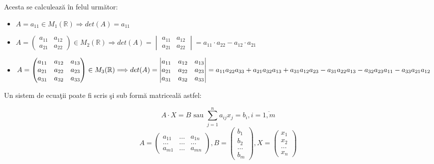 \documentclass{article}
\begin{document}
Acesta se calculează în felul următor:
\begin{itemize}
	\item $A = a_{11} \in M_1(\mathbb{R}) \Longrightarrow det(A) = a_{11}$
	\item $A = \begin{pmatrix}a_{11} & a_{12} \\ a_{21} & a_{22}\end{pmatrix} \in M_2(\mathbb{R}) \Longrightarrow det(A) = \begin{vmatrix}a_{11} & a_{12} \\ a_{21} & a_{22}\end{vmatrix} = a_{11}\cdot a_{22} - a_{12}\cdot a_{21}$
		\item $A = \begin{pmatrix}a_{11} & a_{12} & a_{13} \\ a_{21} & a_{22} & a_{23} \\ a_{31} & a_{32} & a_{33}\end{pmatrix} \in M_3(\mathbb{R}) \Longrightarrow \\
				det(A) = \begin{vmatrix}a_{11} & a_{12} & a_{13} \\ a_{21} & a_{22} & a_{23} \\ a_{31} & a_{32} & a_{33}\end{vmatrix} = a_{11}a_{22}a_{33}+a_{21}a_{32}a_{13}+a_{31}a_{12}a_{23} - a_{31}a_{22}a_{13} - a_{32}a_{23}a_{11} - a_{33}a_{21}a_{12}$
\end{itemize}

Un sistem de ecuaţii poate fi scris şi sub formă matriceală astfel:

$$A \cdot X = B \text{ sau } \sum_{j=1}^n a_{ij}x_j = b_i, i=\overline{1,m}$$
$$A = \begin{pmatrix}a_{11} & \ldots & a_{1n}\\\ldots & \ldots & \ldots\\a_{m1} & \ldots & a_{mn}\end{pmatrix}, B = \begin{pmatrix}b_1\\b_2\\\ldots\\b_m\end{pmatrix}, X = \begin{pmatrix}x_1\\x_2\\\ldots\\x_n\end{pmatrix}$$
\end{document}

